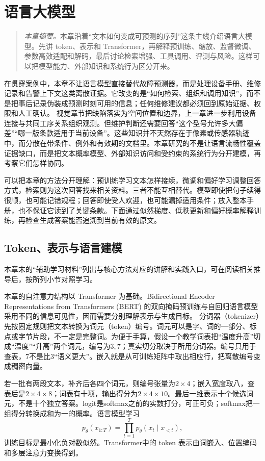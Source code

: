 \chapter{语言大模型}
\begin{quote}\small
\textit{本章摘要。}本章沿着“文本如何变成可预测的序列”这条主线介绍语言大模型。先讲 token、表示和 Transformer，再解释预训练、缩放、监督微调、参数高效适配和解码，最后讨论检索增强、工具调用、评测与风险。这样可以把模型能力、外部知识和系统行为区分开来。
\end{quote}
在贯穿案例中，本章不让语言模型直接替代故障预测器，而是处理设备手册、维修记录和告警上下文这类离散证据。它改变的是“如何检索、组织和调用知识”，而不是把事后记录伪装成预测时刻可用的信息；任何维修建议都必须回到原始证据、权限和人工确认。
视觉章节把缺陷落实为空间位置和边界，上一章进一步利用设备连接与共同工序关系组织观测。但维护判断还需要回答“这个型号允许多大偏差”“哪一版条款适用于当前设备”。这些知识并不天然存在于像素或传感器轨迹中，而分散在带条件、例外和有效期的文档里。本章研究的不是让语言流畅性覆盖证据缺口，而是把文本概率模型、外部知识访问和受约束的系统行为分开建模，再考察它们怎样协同。

可以把本章的方法分开理解：预训练学习文本怎样接续，微调和偏好学习调整回答方式，检索则为这次回答找来相关资料。三者不能互相替代。模型即使把句子续得很顺，也可能记错规程；回答即使受人欢迎，也可能漏掉适用条件；放入整本手册，也不保证它读到了关键条款。下面通过似然梯度、低秩更新和偏好概率解释训练，再检查生成答案能否追溯到当前有效的原文。
\section{Token、表示与语言建模}

本章末的“辅助学习材料”列出与核心方法对应的讲解和实践入口，可在阅读相关推导后，按所列小节对照学习。

本章的自注意力结构以 Transformer 为基础\cite{vaswani2017attention}。Bidirectional Encoder Representations from Transformers (BERT) 的双向掩码预训练与自回归语言模型采用不同的信息可见性，因而需要分别理解表示与生成目标\cite{devlin2019bert,brown2020gpt3}。
分词器（tokenizer）先按固定规则把文本转换为词元（token）编号。词元可以是字、词的一部分、标点或字节片段，不一定是完整词。为便于手算，假设一个教学词表把“温度升高”切成“温度”“升高”两个词元，编号为$3,7$；真实切分取决于所用分词器。编号只用于查表，$7$不是比$3$“语义更大”。嵌入就是从可训练矩阵中取出相应行，把离散编号变成稠密向量。

若一批有两段文本，补齐后各四个词元，则编号张量为$2\times4$；嵌入宽度取八，查表后是$2\times4\times8$；词表有十项，输出得分为$2\times4\times10$。最后一维表示十个候选词元，不是十个独立答案。logit是softmax之前的实数打分，可正可负；softmax把一组得分转换成和为一的概率。语言模型学习
\begin{equation}
 p_\theta(x_{1:T})=\prod_{t=1}^{T}p_\theta(x_t\mid x_{<t}),\label{eq:llm-chain-probability}
\end{equation}
训练目标是最小化负对数似然。Transformer中的 token 表示由词嵌入、位置编码和多层注意力变换得到。


